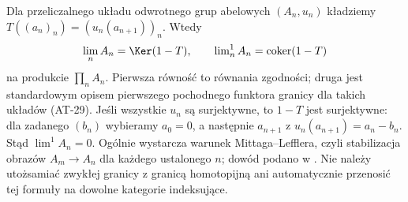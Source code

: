 \begin{uwaga}\label{cat:rem:lim-one}
Dla przeliczalnego układu odwrotnego grup abelowych $(A_n,u_n)$ kładziemy $T((a_n)_n)=(u_n(a_{n+1}))_n$. Wtedy
\[
\lim_n A_n=\Ker(1-T),\qquad
\lim\nolimits^1_n A_n=\operatorname{coker}(1-T)
\]
na produkcie $\prod_n A_n$. Pierwsza równość to równania zgodności; druga jest standardowym opisem pierwszego pochodnego funktora granicy dla takich układów (AT-29). Jeśli wszystkie $u_n$ są surjektywne, to $1-T$ jest surjektywne: dla zadanego $(b_n)$ wybieramy $a_0=0$, a następnie $a_{n+1}$ z $u_n(a_{n+1})=a_n-b_n$. Stąd $\lim^1 A_n=0$. Ogólnie wystarcza warunek Mittaga--Lefflera, czyli stabilizacja obrazów $A_m\to A_n$ dla każdego ustalonego $n$; dowód podano w . Nie należy utożsamiać zwykłej granicy z granicą homotopijną ani automatycznie przenosić tej formuły na dowolne kategorie indeksujące.
\end{uwaga}

